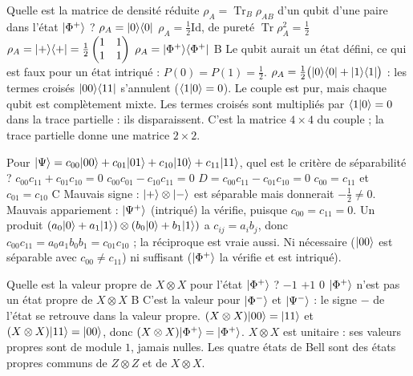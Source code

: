   {Quelle est la matrice de densité réduite $\rho_A=\operatorname{Tr}_B\rho_{AB}$ d'un qubit d'une paire dans l'état $|\Phi^+\rangle$ ?}
  {$\rho_A=|0\rangle\langle 0|$}
  {$\rho_A=\frac12\mathrm{Id}$, de pureté $\operatorname{Tr}\rho_A^2=\frac12$}
  {$\rho_A=|+\rangle\langle +|=\frac12\begin{pmatrix}1&1\\1&1\end{pmatrix}$}
  {$\rho_A=|\Phi^+\rangle\langle \Phi^+|$}
  {B}
\qcmx
  {Le qubit aurait un état défini, ce qui est faux pour un état intriqué : $P(0)=P(1)=\frac12$.}
  {$\rho_A=\frac12\big(|0\rangle\langle 0|+|1\rangle\langle 1|\big)$ : les termes croisés $|00\rangle\langle 11|$ s'annulent ($\langle 1|0\rangle=0$). Le couple est pur, mais chaque qubit est complètement mixte.}
  {Les termes croisés sont multipliés par $\langle 1|0\rangle=0$ dans la trace partielle : ils disparaissent.}
  {C'est la matrice $4\times4$ du couple ; la trace partielle donne une matrice $2\times2$.}

  {Pour $|\Psi\rangle=c_{00}|00\rangle+c_{01}|01\rangle+c_{10}|10\rangle+c_{11}|11\rangle$, quel est le critère de séparabilité ?}
  {$c_{00}c_{11}+c_{01}c_{10}=0$}
  {$c_{00}c_{01}-c_{10}c_{11}=0$}
  {$D=c_{00}c_{11}-c_{01}c_{10}=0$}
  {$c_{00}=c_{11}$ et $c_{01}=c_{10}$}
  {C}
\qcmx
  {Mauvais signe : $|+\rangle\otimes|-\rangle$ est séparable mais donnerait $-\frac12\neq0$.}
  {Mauvais appariement : $|\Psi^+\rangle$ (intriqué) la vérifie, puisque $c_{00}=c_{11}=0$.}
  {Un produit $(a_0|0\rangle+a_1|1\rangle)\otimes(b_0|0\rangle+b_1|1\rangle)$ a $c_{ij}=a_ib_j$, donc $c_{00}c_{11}=a_0a_1b_0b_1=c_{01}c_{10}$ ; la réciproque est vraie aussi.}
  {Ni nécessaire ($|00\rangle$ est séparable avec $c_{00}\neq c_{11}$) ni suffisant ($|\Phi^+\rangle$ la vérifie et est intriqué).}

  {Quelle est la valeur propre de $X\otimes X$ pour l'état $|\Phi^+\rangle$ ?}
  {$-1$}
  {$+1$}
  {$0$}
  {$|\Phi^+\rangle$ n'est pas un état propre de $X\otimes X$}
  {B}
\qcmx
  {C'est la valeur pour $|\Phi^-\rangle$ et $|\Psi^-\rangle$ : le signe $-$ de l'état se retrouve dans la valeur propre.}
  {$(X\otimes X)|00\rangle=|11\rangle$ et $(X\otimes X)|11\rangle=|00\rangle$, donc $(X\otimes X)|\Phi^+\rangle=|\Phi^+\rangle$.}
  {$X\otimes X$ est unitaire : ses valeurs propres sont de module $1$, jamais nulles.}
  {Les quatre états de Bell sont des états propres communs de $Z\otimes Z$ et de $X\otimes X$.}

